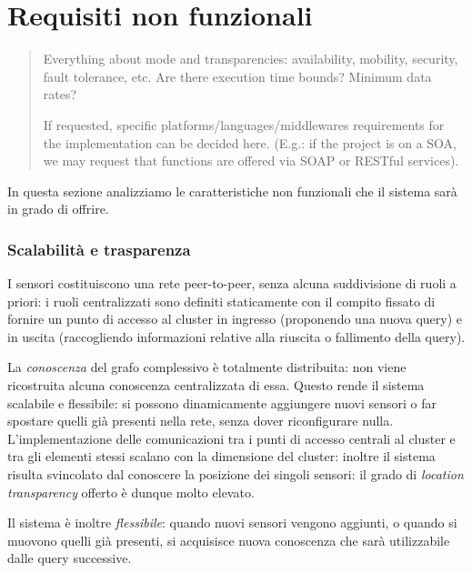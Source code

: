 \documentclass{llncs}
\begin{document}
\section{Requisiti non funzionali}
\label{sec:nonfunc-req}
\begin{quote}
  Everything about mode and transparencies:
  availability, mobility, security, fault tolerance, etc.
  Are there execution time bounds? Minimum data rates?

  If requested, specific platforms/languages/middlewares requirements
  for the implementation can be decided here.
  (E.g.: if the project is on a SOA, we may request that functions
  are offered via SOAP or RESTful services).
\end{quote}

In questa sezione analizziamo le caratteristiche non funzionali
che il sistema sarà in grado di offrire.

\subsubsection*{Scalabilità e trasparenza}
I sensori costituiscono una rete peer-to-peer,
senza alcuna suddivisione di ruoli a priori: i ruoli centralizzati
sono definiti staticamente con il compito fissato di fornire un punto
di accesso al cluster in ingresso (proponendo una nuova query) e
in uscita (raccogliendo informazioni relative alla riuscita
o fallimento della query).

La \emph{conoscenza} del grafo complessivo è totalmente distribuita:
non viene ricostruita alcuna conoscenza centralizzata di essa.
Questo rende il sistema scalabile e flessibile:
si possono dinamicamente aggiungere nuovi sensori o far spostare
quelli già presenti nella rete, senza dover riconfigurare nulla.
L'implementazione delle
comunicazioni tra i punti di accesso centrali al cluster e
tra gli elementi stessi scalano con la dimensione del cluster:
inoltre il sistema risulta svincolato dal conoscere la posizione
dei singoli sensori: il grado di \emph{location transparency} offerto
è dunque molto elevato.

Il sistema è inoltre \emph{flessibile}: quando nuovi sensori vengono
aggiunti, o quando si muovono quelli già presenti, si acquisisce
nuova conoscenza che sarà utilizzabile dalle query successive.
\end{document}
